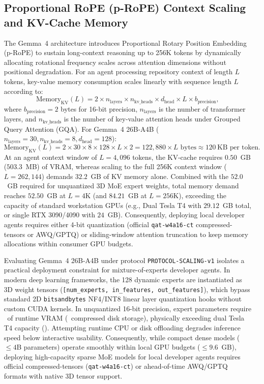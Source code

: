 \documentclass[10pt]{article}
\begin{document}
\subsection{Proportional RoPE (p-RoPE) Context Scaling and KV-Cache Memory}
The Gemma~4 architecture introduces Proportional Rotary Position Embedding (p-RoPE) to sustain long-context reasoning up to 256K tokens by dynamically allocating rotational frequency scales across attention dimensions without positional degradation. For an agent processing repository context of length $L$ tokens, key-value memory consumption scales linearly with sequence length $L$ according to:
\begin{equation}
\text{Memory}_{\text{KV}}(L) = 2 \times n_{\text{layers}} \times n_{\text{kv\_heads}} \times d_{\text{head}} \times L \times b_{\text{precision}},
\end{equation}
where $b_{\text{precision}} = 2$ bytes for 16-bit precision, $n_{\text{layers}}$ is the number of transformer layers, and $n_{\text{kv\_heads}}$ is the number of key-value attention heads under Grouped Query Attention (GQA).
For Gemma~4 26B-A4B ($n_{\text{layers}}=30, n_{\text{kv\_heads}}=8, d_{\text{head}}=128$):
\begin{equation}
\text{Memory}_{\text{KV}}(L) = 2 \times 30 \times 8 \times 128 \times L \times 2 = 122{,}880 \times L \text{ bytes} \approx 120~\text{KB per token}.
\end{equation}
At an agent context window of $L = 4{,}096$ tokens, the KV-cache requires $0.50$~GB ($503.3$~MB) of VRAM, whereas scaling to the full 256K context window ($L = 262{,}144$) demands $32.2$~GB of KV memory alone. Combined with the $52.0$~GB required for unquantized 3D MoE expert weights, total memory demand reaches $52.50$~GB at $L=4\text{K}$ (and $84.21$~GB at $L=256\text{K}$), exceeding the capacity of standard workstation GPUs (e.g., Dual Tesla T4 with $29.12$~GB total, or single RTX 3090/4090 with $24$~GB). Consequently, deploying local developer agents requires either 4-bit quantization (official \texttt{qat-w4a16-ct} compressed-tensors or AWQ/GPTQ) or sliding-window attention truncation to keep memory allocations within consumer GPU budgets.


Evaluating Gemma~4 26B-A4B under protocol \texttt{PROTOCOL\allowbreak -SCALING\allowbreak -v1} isolates a practical deployment constraint for mixture-of-experts developer agents. In modern deep learning frameworks, the 128 dynamic experts are instantiated as 3D weight tensors (\texttt{[num\_experts, in\_features, out\_features]}), which bypass standard 2D \texttt{bitsandbytes} NF4/INT8 linear layer quantization hooks without custom CUDA kernels. In unquantized 16-bit precision, expert parameters require \ScalingMoERuntimeVRAM\ of runtime VRAM (\ScalingMoERequiredVRAM\ compressed disk storage), physically exceeding dual Tesla T4 capacity (\ScalingMoEAvailableVRAM). Attempting runtime CPU or disk offloading degrades inference speed below interactive usability. Consequently, while compact dense models ($\le 4$B parameters) operate smoothly within local GPU budgets ($\le 9.6$~GB), deploying high-capacity sparse MoE models for local developer agents requires official compressed-tensors (\texttt{qat-w4a16-ct}) or ahead-of-time AWQ/GPTQ formats with native 3D tensor support.
\end{document}
